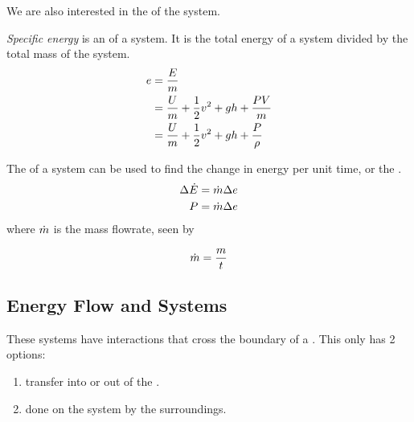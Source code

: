 We are also interested in the  of the system.
\begin{definition}\label{def:Specific_Energy}
  \emph{Specific energy} is an  of a system.
  It is the total energy of a system divided by the total mass of the system.
  \begin{equation}\label{eq:Specific_Energy}
    \begin{aligned}
      e &= \frac{E}{m} \\
      &= \frac{U}{m} + \frac{1}{2} v^{2} + g h + \frac{P V}{m} \\
      &= \frac{U}{m} + \frac{1}{2} v^{2} + g h + \frac{P}{\rho} \\
    \end{aligned}
  \end{equation}
\end{definition}

The  of a system can be used to find the change in energy per unit time, or the .
\begin{equation}\label{eq:Energy_Flow_Rate}
  \begin{aligned}
    \Delta \dot{E} &= \dot{m} \Delta e \\
    P &= \dot{m} \Delta e \\
  \end{aligned}
\end{equation}
where $\dot{m}$ is the mass flowrate, seen by 

\begin{equation}\label{eq:Mass_Flow_Rate}
  \dot{m} = \frac{m}{t}
\end{equation}

\subsection{Energy Flow and Systems}\label{subsec:Energy_Flow_Systems}
These systems have  interactions that cross the boundary of a .
This only has 2 options:
\begin{enumerate}[noitemsep]
\item {} transfer into or out of the .
\item {} done on the system by the surroundings.
\end{enumerate}

